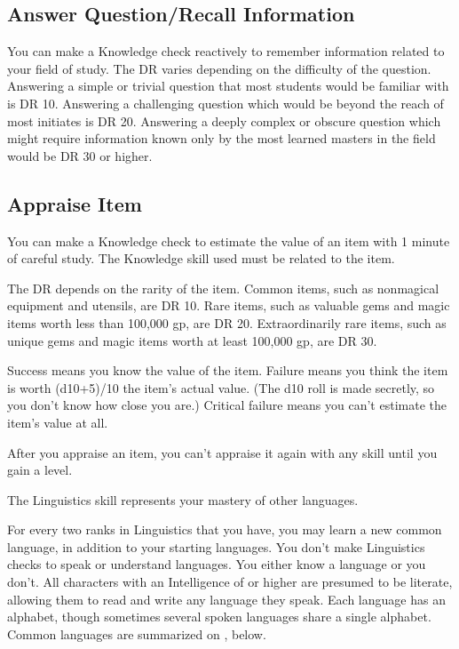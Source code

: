     \subsection{Answer Question/Recall Information}
        You can make a Knowledge check reactively to remember information related to your field of study. The DR varies depending on the difficulty of the question. Answering a simple or trivial question that most students would be familiar with is DR 10. Answering a challenging question which would be beyond the reach of most initiates is DR 20. Answering a deeply complex or obscure question which might require information known only by the most learned masters in the field would be DR 30 or higher.

    \subsection{Appraise Item}
        You can make a Knowledge check to estimate the value of an item with 1 minute of careful study. The Knowledge skill used must be related to the item.

        The DR depends on the rarity of the item. Common items, such as nonmagical equipment and utensils, are DR 10. Rare items, such as valuable gems and magic items worth less than 100,000 gp, are DR 20. Extraordinarily rare items, such as unique gems and magic items worth at least 100,000 gp, are DR 30.

        Success means you know the value of the item. Failure means you think the item is worth (d10+5)/10 \mtimes the item's actual value. (The d10 roll is made secretly, so you don't know how close you are.) Critical failure means you can't estimate the item's value at all.

        After you appraise an item, you can't appraise it again with any skill until you gain a level.

        The Linguistics skill represents your mastery of other languages.

        For every two ranks in Linguistics that you have, you may learn a new common language, in addition to your starting languages. You don't make Linguistics checks to speak or understand languages. You either know a language or you don't. All characters with an Intelligence of  or higher are presumed to be literate, allowing them to read and write any language they speak. Each language has an alphabet, though sometimes several spoken languages share a single alphabet. Common languages are summarized on , below.

